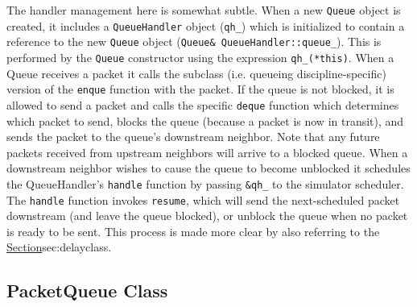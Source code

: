 The handler management here is somewhat subtle.
When a new {\tt Queue} object is created,
it includes a {\tt QueueHandler} object ({\tt qh\_})
which is initialized to contain a reference to the new {\tt Queue} object
({\tt Queue\& QueueHandler::queue\_}).
This is performed by the {\tt Queue} constructor using the expression
{\tt qh\_(*this)}.
When a Queue receives a packet it calls the subclass
(i.e. queueing discipline-specific) version of
the {\tt enque} function with the packet.
If the queue is not blocked, it is allowed to send a packet and
calls the specific {\tt deque} function which determines which
packet to send, blocks the queue (because a packet is now in transit), and
sends the packet to the queue's downstream neighbor.
Note that any future packets received from upstream neighbors
will arrive to a blocked queue.
When a downstream neighbor wishes to cause the queue to become unblocked
it schedules the QueueHandler's {\tt handle} function by
passing {\tt \&qh\_} to the simulator scheduler.
The {\tt handle} function invokes {\tt resume}, which
will send the next-scheduled packet downstream (and leave the queue blocked),
or unblock the queue when no packet is ready to be sent.
This process is made more clear by also referring to the
\href{\fcn[]{LinkDelay::recv} method}{Section}{sec:delayclass}.

\subsection{PacketQueue Class}
\label{sec:packetqclass}

